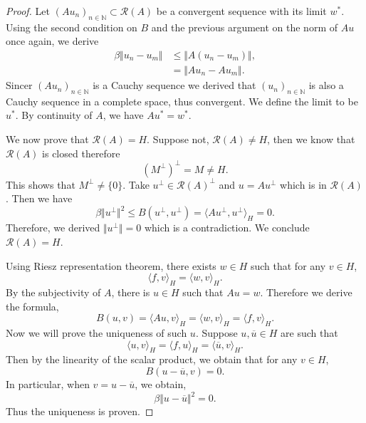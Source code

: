 \documentclass{article}
\numberwithin{equation}{section}
\begin{document}
\begin{proof}
Let $(Au_n)_{n\in\mathbb{N}}\subset\mathcal{R}(A)$ be a convergent sequence with its limit $w^*$. Using the second condition on $B$ and the previous argument on the norm of $Au$ once again, we derive
\begin{align*}
\beta\Vert u_n-u_m\Vert&\leq\Vert A(u_n-u_m)\Vert,\\
& =\Vert Au_n-Au_m\Vert.
\end{align*}
Sincer $(Au_n)_{n\in\mathbb{N}}$ is a Cauchy sequence we derived that $(u_n)_{n\in\mathbb{N}}$ is also a Cauchy sequence in a complete space, thus convergent. We define the limit to be $u^*$. By continuity of $A$, we have $Au^*= w^*$.\\
\par We now prove that $\mathcal{R}(A)=H$. Suppose not, $\mathcal{R}(A)\not=H$, then we know that $\mathcal{R}(A)$ is closed therefore
\begin{equation*}
(M^\perp)^\perp = M\not=H.
\end{equation*}
This shows that $M^\perp\not=\{0\}$. Take $u^\perp\in\mathcal{R}(A)^\perp$ and $u=Au^\perp$ which is in $\mathcal{R}(A)$. Then we have
\begin{equation*}
\beta\Vert u^\perp\Vert^2 \leq B(u^\perp,u^\perp)=\langle Au^\perp,u^\perp\rangle_H=0.
\end{equation*} 
Therefore, we derived $\Vert u^\perp\Vert = 0$ which is a contradiction. We conclude $\mathcal{R}(A)=H$.\\
\par Using Riesz representation theorem, there exists $w\in H$ such that for any $v\in H$,
\begin{equation*}
\langle f, v\rangle_H=\langle w,v\rangle_H.
\end{equation*}
By the subjectivity of $A$, there is $u\in H$ such that $Au=w$. Therefore we derive the formula,
\begin{equation*}
B(u,v) = \langle Au,v\rangle_H= \langle w,v\rangle_H = \langle f, v\rangle_H.
\end{equation*}
Now we will prove the uniqueness of such $u$. Suppose $u,\overline{u}\in H$ are such that
\begin{equation*}
 \langle u,v\rangle_H=\langle f, u\rangle_H=\langle \overline{u},v\rangle_H.
\end{equation*}
Then by the linearity of the scalar product, we obtain that for any $v\in H$,
\begin{equation*}
B(u-\overline{u},v)=0.
\end{equation*}
In particular, when $v=u-\overline{u}$, we obtain,
\begin{equation*}
\beta\Vert u-\overline{u}\Vert^2=0.
\end{equation*}
Thus the uniqueness is proven.
\end{proof}
\end{document}
